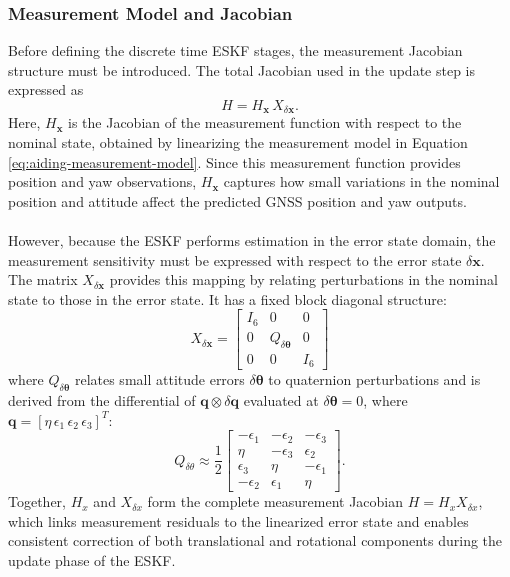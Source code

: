 \subsubsection{Measurement Model and Jacobian}
Before defining the discrete time ESKF stages, the measurement Jacobian structure must be introduced. The total Jacobian used in the update step is expressed as
$$
    H = H_{\mathbf{x}} \, X_{\delta \mathbf{x}}.
$$
Here, $H_{\mathbf{x}}$ is the Jacobian of the measurement function with respect to the nominal state, obtained by linearizing the measurement model in Equation \ref{eq:aiding-measurement-model}. Since this measurement function provides position and yaw observations, $H_{\mathbf{x}}$ captures how small variations in the nominal position and attitude affect the predicted GNSS position and yaw outputs.  
\\ \\
However, because the ESKF performs estimation in the error state domain, the measurement sensitivity must be expressed with respect to the error state $\delta\mathbf{x}$. The matrix $X_{\delta \mathbf{x}}$ provides this mapping by relating perturbations in the nominal state to those in the error state. It has a fixed block diagonal structure:
$$
    X_{\delta \mathbf{x}} =
    \begin{bmatrix}
        I_6 & 0 & 0 \\
        0 & Q_{\delta\boldsymbol{\theta}} & 0 \\
        0 & 0 & I_6
    \end{bmatrix}
$$
where $Q_{\delta\boldsymbol{\theta}}$ relates small attitude errors $\delta\boldsymbol{\theta}$ to quaternion perturbations and is derived from the differential of $\mathbf{q} \otimes \delta\mathbf{q}$ evaluated at $\delta\boldsymbol{\theta}=0$, where $\mathbf{q} = [\eta \, \epsilon_1 \, \epsilon_2 \, \epsilon_3]^T$:
$$
    Q_{\delta\theta} \approx
    \frac{1}{2}
    \begin{bmatrix}
        -\epsilon_1 & -\epsilon_2 & -\epsilon_3 \\
         \eta & -\epsilon_3 & \epsilon_2 \\
         \epsilon_3 & \eta & -\epsilon_1 \\
        -\epsilon_2 & \epsilon_1 & \eta
    \end{bmatrix}.
$$
Together, $H_x$ and $X_{\delta x}$ form the complete measurement Jacobian $H = H_x X_{\delta x}$, which links measurement residuals to the linearized error state and enables consistent correction of both translational and rotational components during the update phase of the ESKF.



